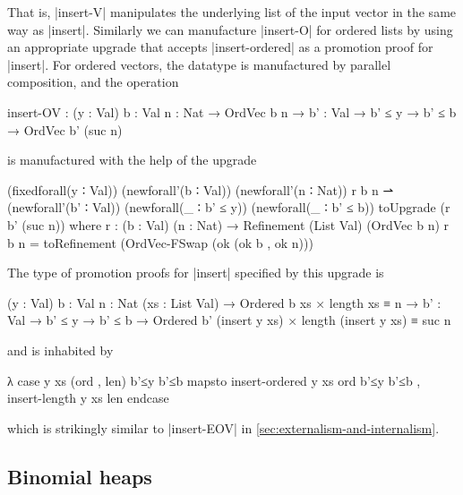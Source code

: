 That is, |insert-V| manipulates the underlying list of the input vector in the same way as |insert|.
Similarly we can manufacture |insert-O| for ordered lists by using an appropriate upgrade that accepts |insert-ordered| as a promotion proof for |insert|.
For ordered vectors, the datatype is manufactured by parallel composition, and the operation
\begin{code}
insert-OV :  (y : Val) {b : Val} {n : Nat} → OrdVec b n →
             {b' : Val} → b' ≤ y → b' ≤ b → OrdVec b' (suc n)
\end{code}
is manufactured with the help of the upgrade
\begin{code}
(fixedforall(y ∶ Val)) (newforall'(b ∶ Val)) (newforall'(n ∶ Nat)) r b n ⇀
(newforall'(b' ∶ Val)) (newforall(_ ∶ b' ≤ y)) (newforall(_ ∶ b' ≤ b)) toUpgrade (r b' (suc n))
where
  r : (b : Val) (n : Nat) → Refinement (List Val) (OrdVec b n)
  r b n = toRefinement (OrdVec-FSwap (ok (ok b , ok n)))
\end{code}
The type of promotion proofs for |insert| specified by this upgrade is
\begin{code}
(y : Val) {b : Val} {n : Nat} (xs : List Val) →
  Ordered b xs × length xs ≡ n →
{b' : Val} → b' ≤ y → b' ≤ b →
  Ordered b' (insert y xs) × length (insert y xs) ≡ suc n
\end{code}
and is inhabited by
\begin{code}
λ case y xs (ord , len) b'≤y b'≤b mapsto  insert-ordered  y xs ord b'≤y b'≤b ,
                                          insert-length   y xs len endcase
\end{code}
which is strikingly similar to |insert-EOV| in \autoref{sec:externalism-and-internalism}.

\subsection{Binomial heaps}
\label{sec:binomial-heaps}

